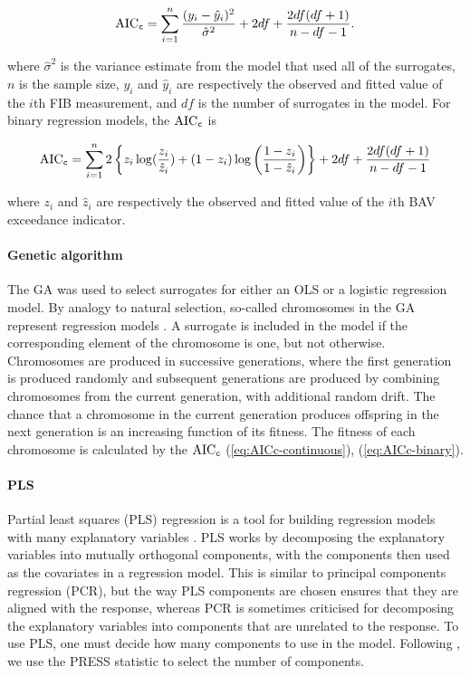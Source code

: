 \documentclass[authoryear,review, 12pt]{elsarticle}
\begin{document}
\begin{align}\label{eq:AICc-continuous}
\text{AIC}_{\tt c} = \sum_{i=1}^n \frac{(y_i - \hat{y}_i)^2}{\hat{\sigma}^2} + 2df + \frac{2df(df+1)}{n-df-1}.
\end{align}

where \(\hat{\sigma}^2\) is the variance estimate from the model that
used all of the surrogates, \(n\) is the sample size, \(y_i\) and
\(\hat{y}_i\) are respectively the observed and fitted value of the
\(i\)th FIB measurement, and \(df\) is the number of surrogates in the
model. For binary regression models, the \(\text{AIC}_{\tt c}\) is

\begin{align}\label{eq:AICc-binary}
\text{AIC}_{\tt c} = \sum_{i=1}^n  2\left\{ z_i \log (\frac{z_i}{\hat{z}_i}) + (1-z_i) \log \left( \frac{1-z_i}{1-\hat{z}_i} \right) \right\} + 2df + \frac{2df(df+1)}{n-df-1}
\end{align}

where \(z_i\) and \(\hat{z}_i\) are respectively the observed and fitted
value of the \(i\)th BAV exceedance indicator.

\paragraph{Genetic algorithm}\label{genetic-algorithm}

The GA was used to select surrogates for either an OLS or a logistic
regression model. By analogy to natural selection, so-called chromosomes
in the GA represent regression models \citep{Fogel-1998}. A surrogate is
included in the model if the corresponding element of the chromosome is
one, but not otherwise. Chromosomes are produced in successive
generations, where the first generation is produced randomly and
subsequent generations are produced by combining chromosomes from the
current generation, with additional random drift. The chance that a
chromosome in the current generation produces offspring in the next
generation is an increasing function of its fitness. The fitness of each
chromosome is calculated by the \(\text{AIC}_{\tt c}\)
(\ref{eq:AICc-continuous}), (\ref{eq:AICc-binary}).

\paragraph{PLS}\label{pls}

Partial least squares (PLS) regression is a tool for building regression
models with many explanatory variables \citep{Wold-Sjostrum-Eriksson-2001}. PLS
works by decomposing the explanatory variables into mutually orthogonal components,
with the components then used as the covariates in a regression model.
This is similar to principal components regression (PCR), but the way
PLS components are chosen ensures that they are aligned with the
response, whereas PCR is sometimes criticised for decomposing the
explanatory variables into components that are unrelated to the response. To use
PLS, one must decide how many components to use in the model. Following
\citep{Brooks-Fienen-Corsi-2013}, we use the PRESS statistic to select
the number of components.
\end{document}
